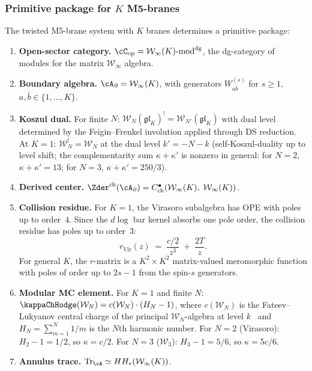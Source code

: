 \subsubsection{Primitive package for $K$ M5-branes}

\begin{conjecture}
\label{conj:twisted-M5-primitive-package}
The twisted M5-brane system with $K$ branes determines a
primitive package:
\begin{enumerate}[label=\textup{(\roman*)},nosep]
\item \textbf{Open-sector category.}
 $\cC_{\mathrm{op}} = \mathcal{W}_\infty(K)\text{-}\mathrm{mod}^{\mathrm{dg}}$,
 the dg-category of modules for the matrix
 $\mathcal{W}_\infty$ algebra.

\item \textbf{Boundary algebra.}
 $\cA_\partial = \mathcal{W}_\infty(K)$,
 with generators $W^{(s)}_{a\bar b}$ for $s \ge 1$,
 $a, \bar b \in \{1, \ldots, K\}$.

\item \textbf{Koszul dual.}
 For finite $N$:
 $\mathcal{W}_N(\mathfrak{gl}_K)^!
 = \mathcal{W}_{N'}(\mathfrak{gl}_K)$
 with dual level determined by the Feigin--Frenkel involution
 applied through DS reduction. At $K = 1$:
 $\mathcal{W}_N^! = \mathcal{W}_N$ at the dual level
 $k' = -N - k$ \textup{(}self-Koszul-duality up to level shift;
 the complementarity sum $\kappa + \kappa'$ is nonzero
 in general: for $N = 2$, $\kappa + \kappa' = 13$;
 for $N = 3$, $\kappa + \kappa' = 250/3$\textup{)}.

\item \textbf{Derived center.}
 $\Zder^{\mathrm{ch}}(\cA_\partial)
 = C^\bullet_{\mathrm{ch}}(\mathcal{W}_\infty(K),\;
 \mathcal{W}_\infty(K))$.

\item \textbf{Collision residue.}
 For $K = 1$, the Virasoro subalgebra has OPE with poles up to
 order~$4$. Since the $d\log$ bar kernel absorbs one pole order, the collision residue has poles up to order~$3$:
 \[
 r_{\mathrm{Vir}}(z)
 \;=\;
 \frac{c/2}{z^3} \;+\; \frac{2T}{z}.
 \]
 For general $K$, the $r$-matrix is a $K^2 \times K^2$ matrix-valued
 meromorphic function with poles of order up to $2s-1$ from the
 spin-$s$ generators.

\item \textbf{Modular MC element.}
 For $K = 1$ and finite $N$: $\kappaChHodge(\mathcal{W}_N)
 = c(\mathcal{W}_N) \cdot (H_N - 1)$, where $c(\mathcal{W}_N)$ is the
 Fateev--Lukyanov central charge of the principal
 $\mathcal{W}_N$-algebra at level $k$~\cite{FL88} and
 $H_N = \sum_{m=1}^N 1/m$ is the $N$th harmonic number.
 For $N = 2$ \textup{(}Virasoro\textup{)}: $H_2 - 1 = 1/2$,
 so $\kappa = c/2$.
 For $N = 3$ \textup{(}$\mathcal{W}_3$\textup{)}: $H_3 - 1 = 5/6$,
 so $\kappa = 5c/6$.

\item \textbf{Annulus trace.}
 $\operatorname{Tr}_\cA \simeq HH_*(\mathcal{W}_\infty(K))$.
\end{enumerate}
\end{conjecture}


